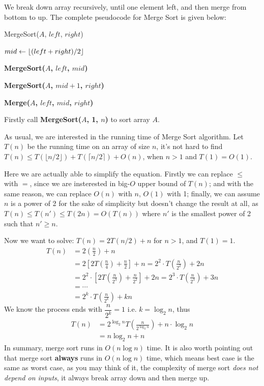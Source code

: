\documentclass[11pt, a4paper]{COMP3711}
\begin{document}
\begin{spacing}{1.5}
    We break down array recursively, until one element left,
    and then merge from bottom to up.
    The complete pseudocode for Merge Sort is given below:
    \begin{algorithm*}
        \caption{MergeSort($A$, $left$, $right$)}
        $mid\leftarrow \lfloor (left + right) / 2 \rfloor$


        {\bf MergeSort($A$, $left$, $mid$)}

        {\bf MergeSort($A$, $mid+1$, $right$)}


        {\bf Merge($A$, $left$, $mid$, $right$)}
    \end{algorithm*}

    Firstly call {\bf MergeSort($A$, 1, $n$)} to sort array $A$.
    
    As usual, we are interested in the running time of Merge Sort 
    algorithm. Let $T(n)$ be the running time on an array of size $n$,
    it's not hard to find 
    $T(n)\le T(\lfloor n/2 \rfloor) + T(\lceil n/2 \rceil)+O(n)$,
    when $n>1$ and $T(1)=O(1)$.

    Here we are actually able to simplify the equation. Firstly 
    we can replace $\le $ with $=$, since we are insterested
    in big-$O$ upper bound of $T(n)$; and with the same 
    reason, we can replace $O(n)$ with $n$, $O(1)$ with 1;
    finally, we can assume $n$ is a power of 2 for the sake of 
    simplicity but doesn't change the result at all, as 
    $T(n)\le T(n')\le T(2n)=O(T(n))$ where $n'$ is the 
    smallest power of 2 such that $n'\ge n$.

    Now we want to solve: 
    $T(n)=2T(n/2)+n$ for $n>1$, and $T(1)=1$.
    \begin{align*}
        T(n) &= 2\left(\frac{n}{2}\right)+n\\
             &= 2\left[ 2T\left(\frac{n}{4}\right) +\frac{n}{2}\right] + n
              = 2^2\cdot T\left(\frac{n}{2^2}\right) +2n\\
             &= 2^2\cdot \left[ 2T\left(\frac{n}{2^3}\right) +\frac{n}{2^2}\right] + 2n
              = 2^3\cdot T\left(\frac{n}{2^3}\right) +3n\\
             &= \cdots\\
             &= 2^{k}\cdot T\left(\frac{n}{2^k}\right) +kn
    \end{align*}
    We know the process ends with $\dfrac{n}{2^k}=1$ i.e. $k=\log_2 n$, thus
    \begin{align*}
        T(n) &= 2^{\log_2 n}T\left(\frac{n}{2^{\log_2 n}}\right)+n\cdot \log_2 n\\
             &= n\log_2 n+n
    \end{align*}
    In summary, merge sort runs in $O(n\log n)$ time.
    It is also worth pointing out that merge sort {\bf always}
    runs in $O(n\log n)$ time, which means best case is the same 
    as worst case, as you may think of it, 
    the complexity of merge sort {\it does not depend on inputs},
    it always break array down and then merge up.


\end{spacing}
\end{document}
